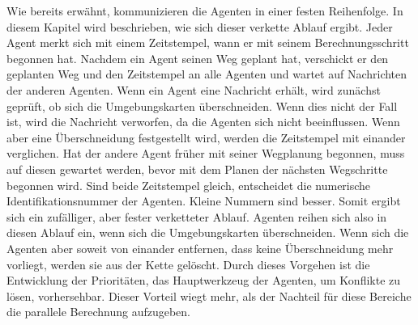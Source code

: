 Wie bereits erwähnt, kommunizieren die Agenten in einer festen Reihenfolge. In diesem Kapitel wird beschrieben, wie sich dieser verkette Ablauf ergibt.
Jeder Agent merkt sich mit einem Zeitstempel, wann er mit seinem Berechnungsschritt begonnen hat. Nachdem ein Agent seinen Weg geplant hat, verschickt er den geplanten Weg und den Zeitstempel an alle Agenten und wartet auf Nachrichten der anderen Agenten. Wenn ein Agent eine Nachricht erhält, wird zunächst geprüft, ob sich die Umgebungskarten überschneiden. Wenn dies nicht der Fall ist, wird die Nachricht verworfen, da die Agenten sich nicht beeinflussen. Wenn aber eine Überschneidung festgestellt wird, werden die Zeitstempel mit einander verglichen. Hat der andere Agent früher mit seiner Wegplanung begonnen, muss auf diesen gewartet werden, bevor mit dem Planen der nächsten Wegschritte begonnen wird. Sind beide Zeitstempel gleich, entscheidet die numerische Identifikationsnummer der Agenten. Kleine Nummern sind besser. Somit ergibt sich ein zufälliger, aber fester verketteter Ablauf. Agenten reihen sich also in diesen Ablauf ein, wenn sich die Umgebungskarten überschneiden. Wenn sich die Agenten aber soweit von einander entfernen, dass keine Überschneidung mehr vorliegt, werden sie aus der Kette gelöscht. Durch dieses Vorgehen ist die Entwicklung der Prioritäten, das Hauptwerkzeug der Agenten, um Konflikte zu lösen, vorhersehbar. Dieser Vorteil wiegt mehr, als der Nachteil für diese Bereiche die parallele Berechnung aufzugeben. \cite{book:regele}